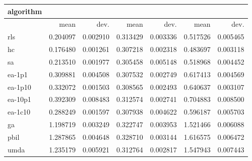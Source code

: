\begin{tabular}{@{}l*{6}{>{{}}N{1}{2}}@{}}
\toprule
{algorithm} &  &  &  \\
\midrule
& {mean} & {dev.} & {mean} & {dev.} & {mean} & {dev.} \\
\midrule
rls & 0.204097 & 0.002910 & 0.313429 & 0.003336 & 0.517526 & 0.005465 \\
 hc & 0.176480 & 0.001261 & 0.307218 & 0.002318 & 0.483697 & 0.003118 \\
 sa & 0.213510 & 0.001977 & 0.305458 & 0.005148 & 0.518968 & 0.004452 \\
 ea-1p1 & 0.309881 & 0.004508 & 0.307532 & 0.002749 & 0.617413 & 0.004569 \\
 ea-1p10 & 0.332072 & 0.001503 & 0.308565 & 0.002493 & 0.640637 & 0.003107 \\
 ea-10p1 & 0.392309 & 0.008483 & 0.312574 & 0.002741 & 0.704883 & 0.008500 \\
 ea-1c10 & 0.288249 & 0.001597 & 0.307938 & 0.004622 & 0.596187 & 0.005703 \\
 ga & 1.198719 & 0.003249 & 0.322747 & 0.003953 & 1.521466 & 0.006088 \\
 pbil & 1.287865 & 0.004648 & 0.328710 & 0.003144 & 1.616575 & 0.006472 \\
 umda & 1.235179 & 0.005921 & 0.312764 & 0.002817 & 1.547943 & 0.007443 \\
 \bottomrule
\end{tabular}
